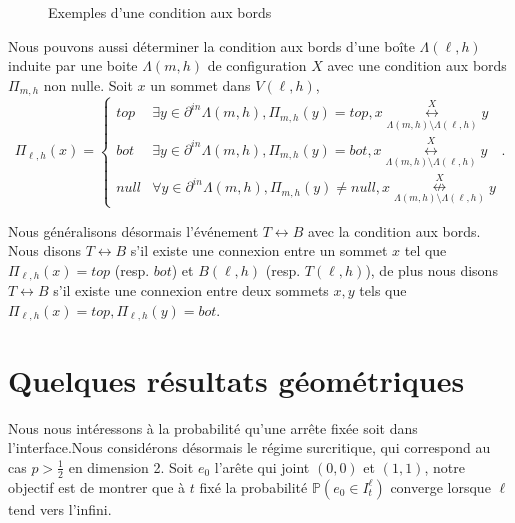 \documentclass[titlepage,a4paper,12pt]{article}
\newcounter{cor}
\begin{document}
\begin{figure}[h]
\center
{}
\caption{Exemples d'une condition aux bords}
\end{figure}

Nous pouvons aussi déterminer la condition aux bords d'une boîte $\Lambda(\ell,h)$ induite par une boite $\Lambda(m,h)$ de configuration $X$ avec une condition aux bords $\Pi_{m,h}$ non nulle. Soit $x$ un sommet dans $V(\ell,h)$, 
$$\Pi_{\ell,h}(x)=\left\lbrace \begin{array}{cl}
top & \exists y \in \partial^{in}\Lambda(m,h), \Pi_{m,h}(y) = top, x\overset{X}{\underset{\Lambda(m,h) \setminus \Lambda(\ell,h)}{\longleftrightarrow}} y\\
bot & \exists y \in \partial^{in}\Lambda(m,h), \Pi_{m,h}(y) = bot, x\overset{X}{\underset{\Lambda(m,h) \setminus \Lambda(\ell,h)}{\longleftrightarrow}} y\\
null & \forall y \in \partial^{in}\Lambda(m,h), \Pi_{m,h}(y) \neq null, x\overset{X}{\underset{\Lambda(m,h) \setminus \Lambda(\ell,h)}{\nleftrightarrow}} y
\end{array} \right..
$$

Nous généralisons désormais l'événement $T\leftrightarrow B$ avec la condition aux bords. Nous disons $T\leftrightarrow B$ s'il existe une connexion entre un sommet $x$ tel que $\Pi_{\ell,h}(x)= top$ (resp. $bot$) et $B(\ell,h)$ (resp. $T(\ell,h)$), de plus nous disons $T\leftrightarrow B$ s'il existe une connexion entre deux sommets $x,y$ tels que $\Pi_{\ell,h}(x) = top, \Pi_{\ell,h}(y) = bot$.
\section{Quelques résultats géométriques}
Nous nous intéressons à la probabilité qu'une arrête fixée soit dans l'interface.Nous considérons désormais le régime surcritique, qui correspond au cas $p>\frac{1}{2}$ en dimension 2. Soit $e_0$ l'arête qui joint $(0,0)$ et $(1,1)$, notre objectif est de montrer que à $t$ fixé la probabilité $\mathbb{P}(e_0 \in I^\ell_t)$ converge lorsque $\ell$ tend vers l'infini.
\end{document}

